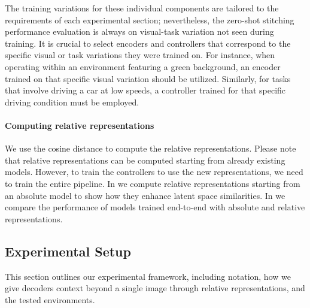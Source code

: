 The training variations for these individual components are tailored to the requirements of each experimental section; nevertheless, the zero-shot stitching performance evaluation is always on visual-task variation not seen during training.
%
% 
It is crucial to select encoders and controllers that correspond to the specific visual or task variations they were trained on. For instance, when operating within an environment featuring a green background, an encoder trained on that specific visual variation should be utilized. Similarly, for tasks that involve driving a car at low speeds, a controller trained for that specific driving condition must be employed.



\paragraph{Computing relative representations} We use the cosine distance to compute the relative representations. Please note that relative representations can be computed starting from already existing models.
However, to train the controllers to use the new representations, we need to train the entire pipeline. In  we compute relative representations starting from an absolute model to show how they enhance latent space similarities.
In  we compare the performance of models trained end-to-end with absolute and relative representations.



\iffalse
\subsection{Experimental Setup}
This section outlines our experimental framework, including notation, how we give decoders context beyond a single image through relative representations, and the tested environments.


